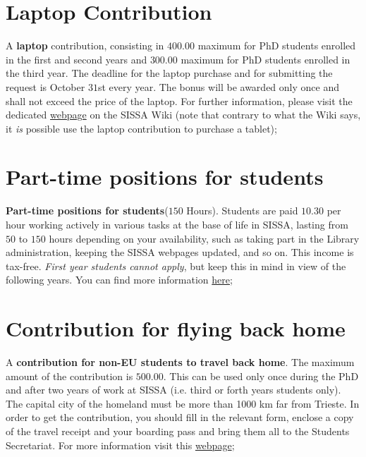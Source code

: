 \documentclass{sissavademecum}
\begin{document}
\section{Laptop Contribution}

A \textbf{laptop} contribution, consisting in \EUR{} $400.00$ maximum for PhD students enrolled in the first and second years and \EUR{} $300.00$ maximum for PhD students enrolled in the third year. The deadline for the laptop purchase and for submitting the request is October $31$st every year. The bonus will be awarded only once and shall not exceed the price of the laptop. For further information, please visit the dedicated \href{http://wiki.sissa.it/students/index.php/Laptop_contribution}{webpage} on the SISSA Wiki (note that contrary to what the Wiki says, it \emph{is} possible use the laptop contribution to purchase a tablet);
    

\section{Part-time positions for students}

\textbf{Part-time positions for students}($150$ Hours). Students are paid \EUR{} $10.30$ per hour working actively in various tasks at the base of life in SISSA, lasting from $50$ to $150$ hours depending on your availability, such as taking part in the Library administration, keeping the SISSA webpages updated, and so on. This income is tax-free. \textit{First year students cannot apply}, but keep this in mind in view of the following years. You can find more information \href{http://wiki.sissa.it/students/index.php/150_hours}{here};


\section{Contribution for flying back home}

A \textbf{contribution for non-EU students to travel back home}. The maximum amount of the contribution is \EUR{} $500.00$. This can be used only once during the PhD and after two years of work at SISSA (i.e. third or forth years students only). The capital city of the homeland must be more than 1000 km far from Trieste. In order to get the contribution, you should fill in the relevant form, enclose a copy of the travel receipt and your boarding pass and bring them all to the Students Secretariat. For more information visit this \href{http://wiki.sissa.it/students/index.php/Travel_grant_contribution}{webpage};
    
\end{document}
